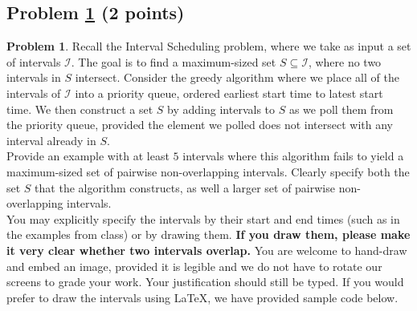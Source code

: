 \documentclass[11pt]{article}
\theoremstyle{definition}
\theoremstyle{definition}
\newtheorem{required}{Problem}
\theoremstyle{definition}
\begin{document}
\subsection{Problem \ref{GreedyFail1} (2 points)}
\begin{required} \label{GreedyFail1}
Recall the \textsf{Interval Scheduling} problem, where we take as input a set of intervals $\mathcal{I}$. The goal is to find a maximum-sized set $S \subseteq \mathcal{I}$, where no two intervals in $S$ intersect. Consider the greedy algorithm where we place all of the intervals of $\mathcal{I}$ into a priority queue, ordered earliest start time to latest start time. We then construct a set $S$ by adding intervals to $S$ as we poll them from the priority queue, provided the element we polled does not intersect with any interval already in $S$. \\

\noindent Provide an example with at least $5$ intervals where this algorithm fails to yield a maximum-sized set of pairwise non-overlapping intervals. Clearly specify both the set $S$ that the algorithm constructs, as well a larger set of pairwise non-overlapping intervals. \\

\noindent You may explicitly specify the intervals by their start and end times (such as in the examples from class) or by drawing them. \textbf{If you draw them, please make it very clear whether two intervals overlap.} You are welcome to hand-draw and embed an image, provided it is legible and we do not have to rotate our screens to grade your work. Your justification should still be typed. If you would prefer to draw the intervals using \LaTeX, we have provided sample code below.
\end{required}
\end{document}
